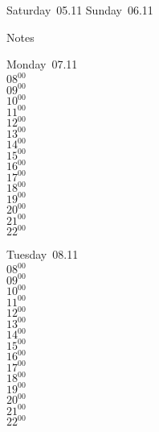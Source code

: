 \documentclass[11pt,a4paper]{book}\usepackage[]{graphicx}\usepackage[]{color}
\begin{document}
\begin{weekendbox}
  Saturday~05.11
  \tcblower
  Sunday~06.11
\end{weekendbox} %
\begin{notebox}
  Notes
\end{notebox}
\clearpage
\begin{headerbox}
\end{headerbox}
\begin{weekdaybox}
  Monday~07.11\\
  { 
  \vfill
  $08^{00}$\\
$09^{00}$\\
$10^{00}$\\
$11^{00}$\\
$12^{00}$\\
$13^{00}$\\
$14^{00}$\\
$15^{00}$\\
$16^{00}$\\
$17^{00}$\\
$18^{00}$\\
$19^{00}$\\
$20^{00}$\\
$21^{00}$\\
$22^{00}$\\
  }
\end{weekdaybox}
\begin{weekdaybox}
  Tuesday~08.11\\
  { 
  \vfill
  $08^{00}$\\
$09^{00}$\\
$10^{00}$\\
$11^{00}$\\
$12^{00}$\\
$13^{00}$\\
$14^{00}$\\
$15^{00}$\\
$16^{00}$\\
$17^{00}$\\
$18^{00}$\\
$19^{00}$\\
$20^{00}$\\
$21^{00}$\\
$22^{00}$\\
  }
\end{weekdaybox}
\end{document}
